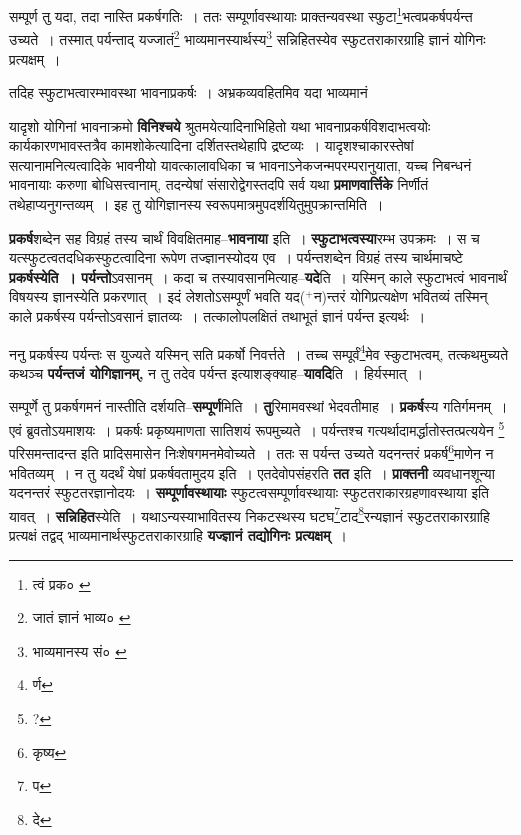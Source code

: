 \documentclass[article,12pt,a4paper]{memoir}
\newcommand{\add}[1]{($^{+}$#1)}
\begin{document}
	  \pstart सम्पूर्ण तु यदा, तदा नास्ति प्रकर्षगतिः । ततः सम्पूर्णावस्थायाः प्राक्तन्यवस्था स्फुटा\footnote{त्वं प्रक० \cite{dp-edE}}भत्वप्रकर्षपर्यन्त उच्यते । तस्मात् पर्यन्ताद् यज्जातं\footnote{जातं ज्ञानं भाव्य० \cite{dp-msC} \cite{dp-msD}} भाव्यमानस्यार्थस्य\footnote{भाव्यमानस्य सं० \cite{dp-msA} \cite{dp-msB} \cite{dp-edP} \cite{dp-edH} \cite{dp-edE}} सन्निहितस्येव स्फुटतराकारग्राहि ज्ञानं योगिनः प्रत्यक्षम् ।
	\pend
       

	  \pstart तदिह स्फुटाभत्वारम्भावस्था भावनाप्रकर्षः । अभ्रकव्यवहितमिव यदा भाव्यमानं
	\pend
      

	  \pstart यादृशो योगिनां भावनाक्रमो \textbf{विनिश्चये} श्रुतमयेत्यादिनाभिहितो यथा भावनाप्रकर्षविशदाभत्वयोः कार्यकारणभावस्तत्रैव कामशोकेत्यादिना दर्शितस्तथेहापि द्रष्टव्यः । यादृशश्चाकारस्तेषां सत्यानामनित्यत्वादिके भावनीयो यावत्कालावधिका च भावनाऽनेकजन्मपरम्परानुयाता, यच्च निबन्धनं भावनायाः करुणा बोधिसत्त्वानाम्, तदन्येषां संसारोद्वेगस्तदपि सर्व यथा \textbf{प्रमाणवार्त्तिके} निर्णीतं तथेहाप्यनुगन्तव्यम् । इह तु योगिज्ञानस्य स्वरूपमात्रमुपदर्शयितुमुपक्रान्तमिति ।
	\pend
      

	  \pstart \textbf{प्रकर्ष}शब्देन सह विग्रहं तस्य चार्थं विवक्षितमाह--\textbf{भावनाया} इति । \textbf{स्फुटाभत्वस्या}रम्भ उपक्रमः । स च यत्स्फुटत्वतदधिकस्फुटत्वादिना रूपेण तज्ज्ञानस्योदय एव । पर्यन्तशब्देन विग्रहं तस्य चार्थमाचष्टे \textbf{प्रकर्षस्येति । पर्यन्तो}ऽवसानम् । कदा च तस्यावसानमित्याह--\textbf{यदे}ति । यस्मिन् काले स्फुटाभत्वं भावनार्थं विषयस्य ज्ञानस्येति प्रकरणात् । इदं लेशतोऽसम्पूर्णं भवति यद\add{न}न्तरं योगिप्रत्यक्षेण भवितव्यं तस्मिन् काले प्रकर्षस्य पर्यन्तोऽवसानं ज्ञातव्यः । तत्कालोपलक्षितं तथाभूतं ज्ञानं पर्यन्त इत्यर्थः ।
	\pend
      

	  \pstart ननु प्रकर्षस्य पर्यन्तः स युज्यते यस्मिन् सति प्रकर्षो निवर्त्तते । तच्च सम्पूर्वं\footnote{र्ण}मेव स्कुटाभत्वम्, तत्कथमुच्यते कथञ्च \textbf{पर्यन्तजं योगिज्ञानम्,} न तु तदेव पर्यन्त इत्याशङ्क्याह--\textbf{यावदि}ति । हिर्यस्मात् ।
	\pend
      

	  \pstart सम्पूर्णे तु प्रकर्षगमनं नास्तीति दर्शयति--\textbf{सम्पूर्ण}मिति । \textbf{तु}रिमामवस्थां भेदवतीमाह । \textbf{प्रकर्ष}स्य गतिर्गमनम् । एवं ब्रुवतोऽयमाशयः । प्रकर्षः प्रकृष्यमाणता सातिशयं रूपमुच्यते । पर्यन्तश्च गत्यर्थादामर्द्धातोस्तत्प्रत्ययेन \footnote{?} परिसमन्तादन्त इति प्रादिसमासेन निःशेषगमनमेवोच्यते । ततः स पर्यन्त उच्यते यदनन्तरं प्रकर्ष\footnote{कृष्य}माणेन न भवितव्यम् । न तु यदर्थं येषां प्रकर्षवतामुदय इति । एतदेवोपसंहरति \textbf{तत} इति । \textbf{प्राक्तनी} व्यवधानशून्या यदनन्तरं स्फुटतरज्ञानोदयः । \textbf{सम्पूर्णावस्थायाः} स्फुटत्वसम्पूर्णावस्थायाः स्फुटतराकारग्रहणावस्थाया इति यावत् । \textbf{सन्निहित}स्येति । यथाऽन्यस्याभावितस्य निकटस्थस्य घटघ\footnote{प}टाद\footnote{दे}रन्यज्ञानं स्फुटतराकारग्राहि प्रत्यक्षं तद्वद् भाव्यमानार्थस्फुटतराकारग्राहि \textbf{यज्ज्ञानं तद्योगिनः प्रत्यक्षम्} ।
	\pend
      
\end{document}
